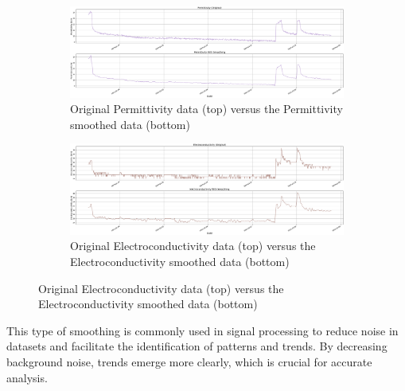 \begin{figure}[htbp]
    \begin{minipage}[b]{0.45\textwidth}
        \centering
        \begin{subfigure}{\textwidth}
            \centering
            \includegraphics[width=\textwidth]{5_ChapterDesign/figuras/2_Smoothing/Smoothing_Permittivity}
            \caption{Original Permittivity data (top) versus the Permittivity smoothed data (bottom)}
            \label{fig:permittivity}
        \end{subfigure}
    \end{minipage}
    \hfill
    \begin{minipage}[b]{0.45\textwidth}
        \centering
        \begin{subfigure}{\textwidth}
            \centering
            \includegraphics[width=\textwidth]{5_ChapterDesign/figuras/2_Smoothing/Smoothing_Electroconductivity}
            \caption{Original Electroconductivity data (top) versus the Electroconductivity smoothed data (bottom)}
            \label{fig:electroconductivity}
        \end{subfigure}
    \end{minipage}
\end{figure}

This type of smoothing is commonly used in signal processing to reduce noise in datasets and facilitate the identification of patterns and trends. By decreasing background noise, trends emerge more clearly, which is crucial for accurate analysis.

